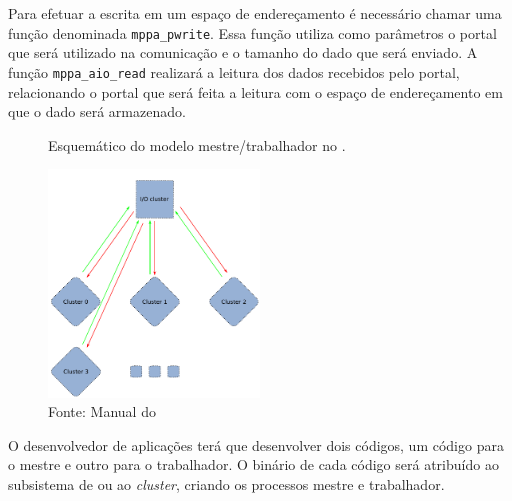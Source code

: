 Para efetuar a escrita em um espaço de endereçamento é necessário chamar uma
função denominada \texttt{mppa\_pwrite}. Essa função utiliza como parâmetros o
portal que será utilizado na comunicação e o tamanho do dado que será enviado.
A função \texttt{mppa\_aio\_read} realizará a leitura dos dados recebidos pelo
portal, relacionando o portal que será feita a leitura com o espaço de
endereçamento em que o dado será armazenado.

\begin{figure}
	\centering
	\caption{Esquemático do modelo mestre/trabalhador no \mppa.}
	\includegraphics[width=0.5\textwidth]{figs/MPPAIPCTutorial.pdf}
    \caption*{Fonte: Manual do \mppa}
	\label{fig:MPPAIPCTutorial}
\end{figure}


O desenvolvedor de aplicações terá que desenvolver dois
códigos, um código para o mestre e outro para o trabalhador. O binário de cada
código será atribuído ao subsistema de \es ou ao \textit{cluster}, criando os
processos mestre e trabalhador.

